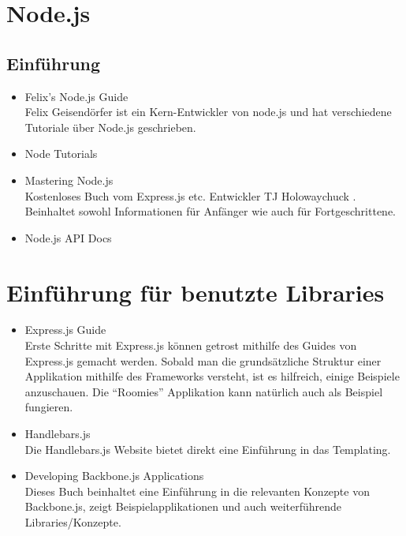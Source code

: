 \section{Node.js}
\label{sec:ti-nodejs}

\subsection*{Einführung}
\begin{itemize}
	\item Felix's Node.js Guide \cite{Nodeguide} \\
		Felix Geisendörfer ist ein Kern-Entwickler von node.js und hat verschiedene
		Tutoriale über Node.js geschrieben.
	\item Node Tutorials \cite{NodeTuts}
	\item Mastering Node.js \cite{MasteringNode} \\
		Kostenloses Buch vom Express.js \cite{Expressjs} etc. Entwickler TJ
		Holowaychuck \cite{TJH}. Beinhaltet sowohl Informationen für Anfänger wie
		auch für Fortgeschrittene.
	\item Node.js API Docs \cite{NodejsAPIDocs}
\end{itemize}


\section{Einführung für benutzte Libraries}
\label{sec:ti-used-libraries}
\begin{itemize}
	\item Express.js Guide \cite{ExpressGuide} \\
		Erste Schritte mit Express.js können getrost mithilfe des Guides von
		Express.js gemacht werden. Sobald man die grundsätzliche Struktur einer
		Applikation mithilfe des Frameworks versteht, ist es hilfreich, einige
		Beispiele \cite{ExpressExamples} anzuschauen. Die ``Roomies''
		Applikation kann natürlich auch als Beispiel fungieren.
	\item Handlebars.js \cite{Handlebars} \\
		Die Handlebars.js Website bietet direkt eine Einführung in das Templating.
	\item Developing Backbone.js Applications \cite{BackboneFundamentals} \\
		Dieses Buch beinhaltet eine Einführung in die relevanten Konzepte von Backbone.js,
		zeigt Beispielapplikationen und auch weiterführende Libraries/Konzepte.
\end{itemize}
